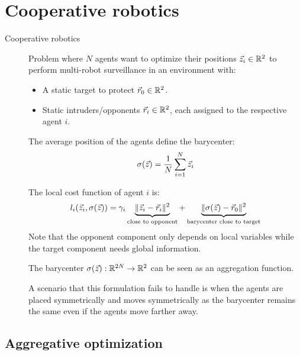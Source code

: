 \chapter{Cooperative robotics}


\begin{description}
    \item[Cooperative robotics] 
        Problem where $N$ agents want to optimize their positions ${\vec{z}}_i \in \mathbb{R}^2$ to perform multi-robot surveillance in an environment with:
        \begin{itemize}
            \item A static target to protect ${\vec{r}}_0 \in \mathbb{R}^2$.
            \item Static intruders/opponents ${\vec{r}}_i \in \mathbb{R}^2$, each assigned to the respective agent $i$.
        \end{itemize}

        The average position of the agents define the barycenter:
        \[ \sigma({\vec{z}}) = \frac{1}{N} \sum_{i=1}^N {\vec{z}}_i \]

        The local cost function of agent $i$ is:
        \[
            l_i({\vec{z}}_i, \sigma({\vec{z}})) = 
            \gamma_i \underbrace{\Vert {\vec{z}}_i - {\vec{r}}_i \Vert^2}_{\text{close to opponent}} + 
            \underbrace{\Vert \sigma({\vec{z}}) - {\vec{r}}_0 \Vert^2}_{\text{barycenter close to target}}
        \]
        Note that the opponent component only depends on local variables while the target component needs global information.

        \begin{remark}
            The barycenter $\sigma({\vec{z}}): \mathbb{R}^{2N} \rightarrow \mathbb{R}^{2}$ can be seen as an aggregation function.
        \end{remark}

        \begin{remark}
            A scenario that this formulation fails to handle is when the agents are placed symmetrically and moves symmetrically as the barycenter remains the same even if the agents move farther away.
        \end{remark}
\end{description}



\section{Aggregative optimization}

